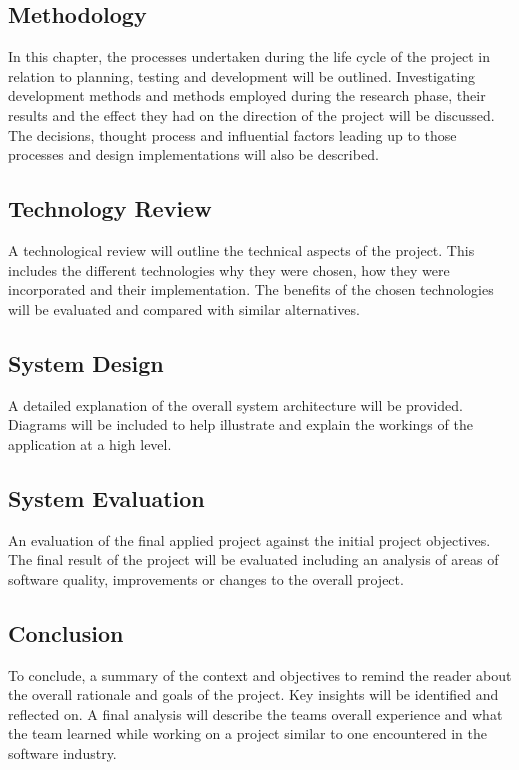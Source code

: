 \subsection{Methodology}
In this chapter, the processes undertaken during the life cycle of the project in relation to planning, testing and development will be outlined. Investigating development methods and methods employed during the research phase, their results and the effect they had on the direction of the project will be discussed. The decisions, thought process and influential factors leading up to those processes and design implementations will also be described.

\subsection{Technology Review}
A technological review will outline the technical aspects of the project. This includes the different technologies why they were chosen, how they were incorporated and their implementation. The benefits of the chosen technologies will be evaluated and compared with similar alternatives.

\subsection{System Design}
A detailed explanation of the overall system architecture will be provided. Diagrams will be included to help illustrate and explain the workings of the application at a high level.

\subsection{System Evaluation}
An evaluation of the final applied project against the initial project objectives. The final result of the project will be evaluated including an analysis of areas of software quality, improvements or changes to the overall project.

\subsection{Conclusion}
To conclude, a summary of the context and objectives to remind the reader about the overall rationale and goals of the project. Key insights will be identified and reflected on. A final analysis will describe the teams overall experience and what the team learned while working on a project similar to one encountered in the software industry.

